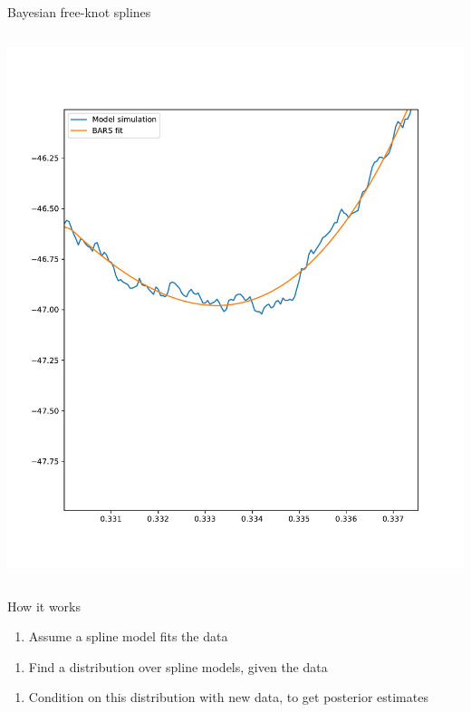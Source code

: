 \documentclass[presentation]{beamer}
\begin{document}
\begin{frame}[plain,label={sec:orge9e21f3}]{Bayesian free-knot splines}
\begin{columns}
\begin{column}{0.5\columnwidth}
\begin{center}
\includegraphics[width=.9\linewidth]{./BARS2.pdf}
\end{center}
\end{column}
\end{columns}
\end{frame}


\begin{frame}[label={sec:org33a77fc}]{How it works}
\begin{enumerate}
\item Assume a spline model fits the data
\end{enumerate}
\vfill
\begin{enumerate}
\item Find a distribution over spline models, given the data
\end{enumerate}
\vfill
\begin{enumerate}
\item Condition on this distribution with new data, to get posterior estimates
\end{enumerate}
\end{frame}
\end{document}
